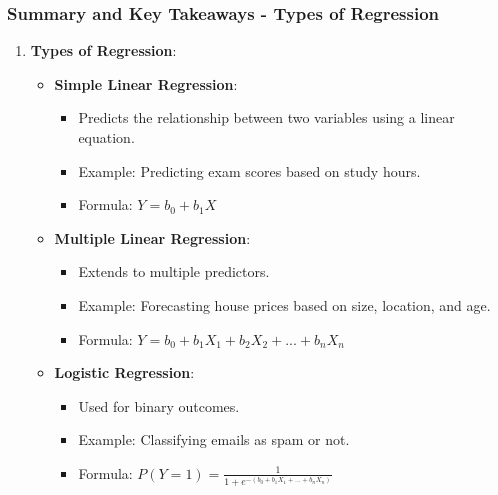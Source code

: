 \documentclass[aspectratio=169]{beamer}
\begin{document}
\begin{frame}[fragile]
    \frametitle{Summary and Key Takeaways - Types of Regression}
    \begin{enumerate}
        \item \textbf{Types of Regression}:
            \begin{itemize}
                \item \textbf{Simple Linear Regression}:
                    \begin{itemize}
                        \item Predicts the relationship between two variables using a linear equation.
                        \item Example: Predicting exam scores based on study hours.
                        \item Formula: \( Y = b_0 + b_1X \)
                    \end{itemize}
                    
                \item \textbf{Multiple Linear Regression}:
                    \begin{itemize}
                        \item Extends to multiple predictors.
                        \item Example: Forecasting house prices based on size, location, and age.
                        \item Formula: \( Y = b_0 + b_1X_1 + b_2X_2 + ... + b_nX_n \)
                    \end{itemize}
                    
                \item \textbf{Logistic Regression}:
                    \begin{itemize}
                        \item Used for binary outcomes.
                        \item Example: Classifying emails as spam or not.
                        \item Formula: \( P(Y=1) = \frac{1}{1 + e^{-(b_0 + b_1X_1 + ... + b_nX_n)}} \)
                    \end{itemize}
            \end{itemize}
    \end{enumerate}
\end{frame}
\end{document}
